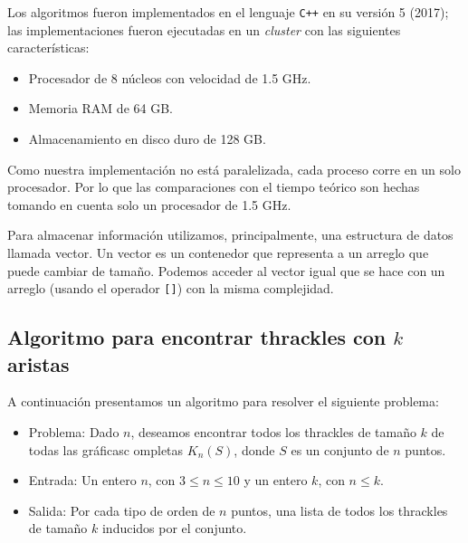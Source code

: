 Los algoritmos fueron implementados en el lenguaje \texttt{C++} en su versión 5 (2017);
las implementaciones fueron ejecutadas en un \emph{cluster} con las siguientes características:
\begin{itemize}
  \item Procesador de 8 núcleos con velocidad de 1.5 GHz.
  \item Memoria RAM de 64 GB.
  \item Almacenamiento en disco duro de 128 GB.
\end{itemize}
Como nuestra implementación no está paralelizada, cada proceso corre en un solo procesador. Por lo que las comparaciones con el tiempo teórico son hechas tomando en cuenta solo un procesador de 1.5 GHz.

Para almacenar información utilizamos, principalmente, una estructura de datos llamada vector. Un vector es un contenedor que representa a un arreglo que puede cambiar de tamaño. Podemos acceder al vector igual que se hace con un arreglo (usando el operador \texttt{[]}) con la misma complejidad.

\subsection{Algoritmo para encontrar thrackles con $k$
  aristas}\label{seccion_algoritmo_kthrackles}
  A continuación presentamos un algoritmo para resolver el siguiente problema:
  \begin{itemize}
    \item[] Problema: Dado $n$, deseamos encontrar todos los thrackles de tamaño $k$ de todas las gráficasc ompletas $K_n(S)$, donde $S$ es un conjunto de $n$ puntos.
    \item[] Entrada: Un entero $n$, con $ 3 \leq n \leq 10$ y un entero $k$, con $ n \leq
    k$.
    \item[] Salida: Por cada tipo de orden de $n$ puntos, una lista de todos los thrackles de tamaño $k$ inducidos por el conjunto.
  \end{itemize}

